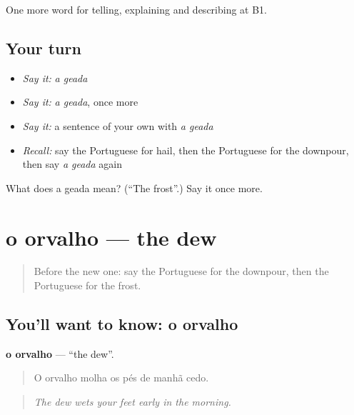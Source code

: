 \begin{grammarlens}[title={What you've built}]
One more word for telling, explaining and describing at B1.
\end{grammarlens}

\subsection*{Your turn}
\begin{itemize}
\raggedright
  \item \emph{Say it:} \emph{a geada}
  \item \emph{Say it:} \emph{a geada}, once more
  \item \emph{Say it:} a sentence of your own with \emph{a geada}
  \item \emph{Recall:} say the Portuguese for hail, then the Portuguese for the downpour, then say \emph{a geada} again
\end{itemize}

\begin{tcolorbox}[breakable,colback=teal!4,colframe=teal!35!black,title={Before you move on}]
What does a geada mean? (\textquotedblleft{}The frost\textquotedblright{}.) Say it once more.
\end{tcolorbox}
\section[o orvalho]{o orvalho — the dew}

\label{lesson:PT-C464-orvalho}



\begin{quote}
Before the new one: say the Portuguese for the downpour, then the Portuguese for the frost.
\end{quote}

\subsection*{You'll want to know: o orvalho}
\textbf{o orvalho} — \textquotedblleft{}the dew\textquotedblright{}.

\begin{quote}
O orvalho molha os pés de manhã cedo.
\end{quote}

\begin{quote}
\emph{The dew wets your feet early in the morning.}
\end{quote}

